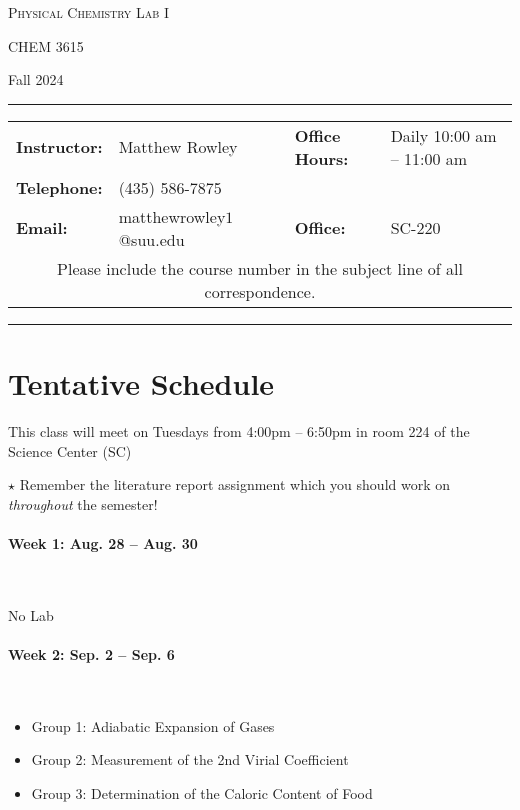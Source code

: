 \documentclass[12pt, letterpaper]{article}
\begin{document}
\begin{center}
	{\Large \textsc{Physical Chemistry Lab I}}

	CHEM 3615
\end{center}

\begin{center}
	{\large Fall 2024}
\end{center}
\begin{center}
	\rule{0.99\textwidth}{0.4pt}
	\begin{tabular}{llcll}
		\textbf{Instructor:} & Matthew Rowley           &  & \textbf{Office Hours:} & Daily 10:00 am -- 11:00 am \\
		\textbf{Telephone:}  & (435) 586-7875           &  &                        &  \\
		\textbf{Email:}      & matthewrowley$1$@suu.edu &  & \textbf{Office:}       & SC-220                   \\
		\multicolumn{5}{c}{Please include the course number in the subject line of all correspondence.}
	\end{tabular}
	\rule{0.99\textwidth}{0.4pt}
\end{center}

\section*{Tentative Schedule}
This class will meet on Tuesdays from 4:00pm -- 6:50pm in room 224 of the Science Center (SC)

\noindent
$\star$ Remember the literature report assignment which you should work on \emph{throughout} the semester!

\paragraph{Week 1: Aug. 28 -- Aug. 30}~

No Lab

\paragraph{Week 2: Sep. 2 -- Sep. 6}~

\begin{itemize}
  \item Group 1: Adiabatic Expansion of Gases
  \item Group 2: Measurement of the 2nd Virial Coefficient
  \item Group 3: Determination of the Caloric Content of Food
\end{itemize}
\end{document}
